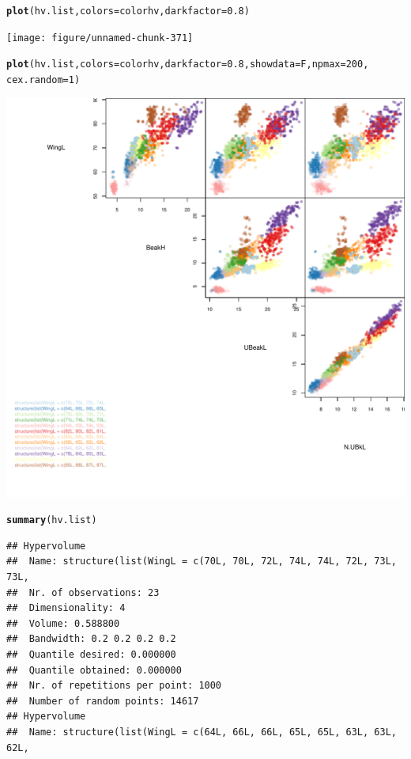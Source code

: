\documentclass[12pt]{article}\usepackage[]{graphicx}\usepackage[]{color}
\makeatletter
\def\maxwidth{ %
  \ifdim\Gin@nat@width>\linewidth
    \linewidth
  \else
    \Gin@nat@width
  \fi
}
\newcommand{\hlnum}[1]{\textcolor[rgb]{0.686,0.059,0.569}{#1}}%
\newcommand{\hlstd}[1]{\textcolor[rgb]{0.345,0.345,0.345}{#1}}%
\newcommand{\hlkwc}[1]{\textcolor[rgb]{0.333,0.667,0.333}{#1}}%
\newcommand{\hlkwd}[1]{\textcolor[rgb]{0.737,0.353,0.396}{\textbf{#1}}}%
\newenvironment{kframe}{%
 \def\at@end@of@kframe{}%
 \ifinner\ifhmode%
  \def\at@end@of@kframe{\end{minipage}}%
  \begin{minipage}{\columnwidth}%
 \fi\fi%
 \def\FrameCommand##1{\hskip\@totalleftmargin \hskip-\fboxsep
 \colorbox{shadecolor}{##1}\hskip-\fboxsep
     \hskip-\linewidth \hskip-\@totalleftmargin \hskip\columnwidth}%
 \MakeFramed {\advance\hsize-\width
   \@totalleftmargin\z@ \linewidth\hsize
   \@setminipage}}%
 {\par\unskip\endMakeFramed%
 \at@end@of@kframe}
\newenvironment{knitrout}{}{} %
\makeatother
\begin{document}
\begin{knitrout}
\begin{kframe}
\begin{alltt}
\hlkwd{plot}\hlstd{(hv.list,} \hlkwc{colors} \hlstd{= colorhv,} \hlkwc{darkfactor} \hlstd{=} \hlnum{0.8}\hlstd{)}
\end{alltt}
\end{kframe}
\texttt{[image: figure/unnamed-chunk-371]} 
\begin{kframe}\begin{alltt}
\hlkwd{plot}\hlstd{(hv.list,} \hlkwc{colors} \hlstd{= colorhv,} \hlkwc{darkfactor} \hlstd{=} \hlnum{0.8}\hlstd{,} \hlkwc{showdata} \hlstd{= F,} \hlkwc{npmax} \hlstd{=} \hlnum{200}\hlstd{,}
    \hlkwc{cex.random} \hlstd{=} \hlnum{1}\hlstd{)}
\end{alltt}
\end{kframe}
\includegraphics[width=\maxwidth]{figure/unnamed-chunk-372} 
\begin{kframe}\begin{alltt}
\hlkwd{summary}\hlstd{(hv.list)}
\end{alltt}
\begin{verbatim}
## Hypervolume
## 	Name: structure(list(WingL = c(70L, 70L, 72L, 74L, 74L, 72L, 73L, 73L, 
## 	Nr. of observations: 23
## 	Dimensionality: 4
## 	Volume: 0.588800
## 	Bandwidth: 0.2 0.2 0.2 0.2
## 	Quantile desired: 0.000000
## 	Quantile obtained: 0.000000
## 	Nr. of repetitions per point: 1000
## 	Number of random points: 14617
## Hypervolume
## 	Name: structure(list(WingL = c(64L, 66L, 66L, 65L, 65L, 63L, 63L, 62L, 

\end{verbatim}
\end{kframe}
\end{knitrout}
\end{document}
